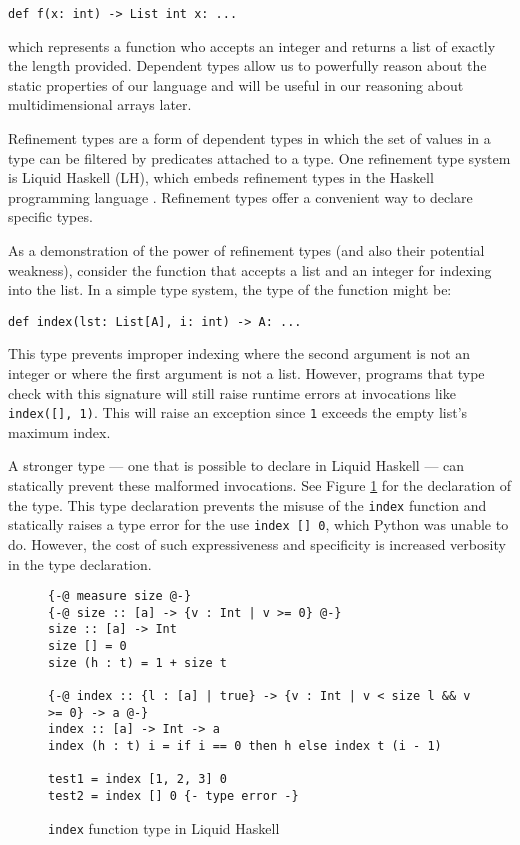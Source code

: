 \documentclass[12pt]{report}
\begin{document}
\begin{itemize}
\begin{singlespace*}\begin{center}
    \texttt{def f(x: int) -> List int x: ...}
\end{center} \end{singlespace*}
which represents a function who accepts an integer and returns a list of exactly the length provided. Dependent types allow us to powerfully reason about the static properties of our language and will be useful in our reasoning about multidimensional arrays later.

Refinement types are a form of dependent types in which the set of values in a type can be filtered by predicates attached to a type. One refinement type system is Liquid Haskell (LH), which embeds refinement types in the Haskell programming language \cite{Jhala2014RefinementTF}. Refinement types offer a convenient way to declare specific types.

As a demonstration of the power of refinement types (and also their potential weakness), consider the function that accepts a list and an integer for indexing into the list. In a simple type system, the type of the function might be:

\begin{singlespace*}
\begin{center} \texttt{def index(lst: List[A], i: int) -> A: ...} \end{center} \end{singlespace*}

This type prevents improper indexing where the second argument is not an integer or where the first argument is not a list. However, programs that type check with this signature will still raise runtime errors at invocations like \texttt{index([], 1)}. This will raise an exception since \texttt{1} exceeds the empty list's maximum index.

A stronger type --- one that is possible to declare in Liquid Haskell --- can statically prevent these malformed invocations. See Figure \ref{lh-type-indexing} for the declaration of the type. This type declaration prevents the misuse of the \texttt{index} function and statically raises a type error for the use \texttt{index [] 0}, which Python was unable to do. However, the cost of such expressiveness and specificity is increased verbosity in the type declaration.

\begin{figure}
    \centering
    \begin{verbatim}
{-@ measure size @-}
{-@ size :: [a] -> {v : Int | v >= 0} @-}
size :: [a] -> Int
size [] = 0
size (h : t) = 1 + size t

{-@ index :: {l : [a] | true} -> {v : Int | v < size l && v >= 0} -> a @-}
index :: [a] -> Int -> a
index (h : t) i = if i == 0 then h else index t (i - 1)

test1 = index [1, 2, 3] 0
test2 = index [] 0 {- type error -}\end{verbatim}
    \caption{\texttt{index} function type in Liquid Haskell}
    \label{lh-type-indexing}
\end{figure}

\end{itemize}
\end{document}
